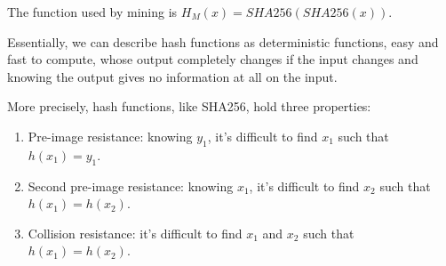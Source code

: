 The function used by mining is $H_M(x) = SHA256(SHA256(x))$.

Essentially, we can describe hash functions as deterministic functions, easy and fast to compute, whose output completely changes if the input changes and knowing the output gives no information at all on the input.

More precisely, hash functions, like SHA256, hold three properties: \newline

\begin{enumerate}
  \item Pre-image resistance: knowing $y_1$, it's difficult to find $x_1$ such that $h(x_1) = y_1$.
  \item Second pre-image resistance: knowing $x_1$, it's difficult to find $x_2$ such that $h(x_1) = h(x_2)$.
  \item Collision resistance: it's difficult to find $x_1$ and $x_2$ such that $h(x_1) = h(x_2)$.
\end{enumerate}
